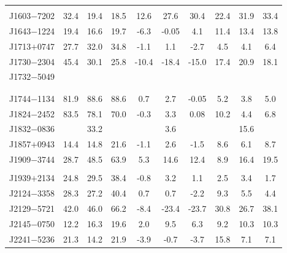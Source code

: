 \documentclass[useAMS,usenatbib]{mn2e}
\begin{document}
\begin{table}
\begin{center}
\begin{tabular}{lccccccccc}
       &      &   &   &   &   &   &   &                                              \\
J1603$-$7202     &  32.4 &  19.4 &  18.5 &  12.6 & 27.6 & 30.4 & 22.4 &  31.9 &  33.4  \\
J1643$-$1224     &  19.4 &  16.6 &  19.7 &  -6.3 & -0.05& 4.1  & 11.4 &  13.4 &  13.8  \\
J1713$+$0747     &  27.7 &  32.0 &  34.8 &  -1.1 & 1.1  & -2.7 & 4.5  &  4.1  &  6.4   \\
J1730$-$2304     &  45.4 &  30.1 &  25.8 &  -10.4& -18.4& -15.0& 17.4 &  20.9 &  18.1  \\
J1732$-$5049     &      &   &   &   &   &   &   &              \\                      \\
       &      &   &   &   &   &   &   &                                              \\
J1744$-$1134     &  81.9 &  88.6 &  88.6 &  0.7  & 2.7  & -0.05& 5.2  &  3.8  &  5.0   \\
J1824$-$2452     &  83.5 &  78.1 &  70.0 &  -0.3 & 3.3  & 0.08 & 10.2 &  4.4  &  6.8   \\
J1832$-$0836     &   &  33.2 &   &   & 3.6  &  &  &  15.6 &    \\
J1857$+$0943     &  14.4 &  14.8 &  21.6 &  -1.1 & 2.6  & -1.5 & 8.6  &  6.1  &  8.7   \\
J1909$-$3744     &  28.7 &  48.5 &  63.9 &  5.3  & 14.6 & 12.4 & 8.9  &  16.4 &  19.5  \\
       &      &   &   &   &   &   &   &                                              \\
J1939$+$2134     &  24.8 &  29.5 &  38.4 &  -0.8 & 3.2  & 1.1  & 2.5  &  3.4  &  1.7   \\
J2124$-$3358     &  28.3 &  27.2 &  40.4 &  0.7  & 0.7  & -2.2 & 9.3  &  5.5  &  4.4   \\
J2129$-$5721     &  42.0 &  46.0 &  66.2 &  -8.4 & -23.4& -23.7& 30.8 &  26.7 &  38.1  \\
J2145$-$0750     &  12.2 &  16.3 &  19.6 &  2.0  & 9.5  & 6.3  & 9.2  &  10.3 &  10.3  \\
J2241$-$5236     &  21.3 &  14.2 &  21.9 &  -3.9 & -0.7 & -3.7 & 15.8 &  7.1  &  7.1   \\
\hline
\end{tabular}
\end{center}
\end{table}
\end{document}
